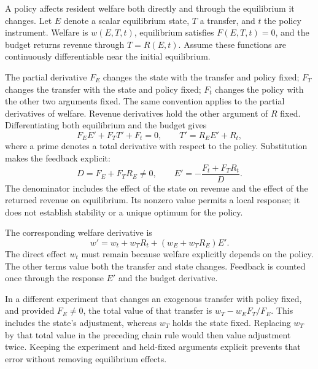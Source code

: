 A policy affects resident welfare both directly and through the equilibrium it
changes. Let $E$ denote a scalar equilibrium state, $T$ a transfer, and $t$ the
policy instrument. Welfare is $w(E,T,t)$, equilibrium satisfies $F(E,T,t)=0$,
and the budget returns revenue through $T=R(E,t)$. Assume these functions are
continuously differentiable near the initial equilibrium.

The partial derivative $F_E$ changes the state with the transfer and policy
fixed; $F_T$ changes the transfer with the state and policy fixed; $F_t$ changes
the policy with the other two arguments fixed. The same convention applies to
the partial derivatives of welfare. Revenue derivatives hold the other argument
of $R$ fixed. Differentiating both equilibrium and the budget gives
\[
 F_E E'+F_T T'+F_t=0,\qquad T'=R_E E'+R_t,
\]
where a prime denotes a total derivative with respect to the policy. Substitution
makes the feedback explicit:
\[
 D=F_E+F_T R_E\ne0,\qquad E'=-\frac{F_t+F_T R_t}{D}.
\]
The denominator includes the effect of the state on revenue and the effect of
the returned revenue on equilibrium. Its nonzero value permits a local response;
it does not establish stability or a unique optimum for the policy.

The corresponding welfare derivative is
\[
 w'=w_t+w_T R_t+(w_E+w_T R_E)E'.
\]
The direct effect $w_t$ must remain because welfare explicitly depends on the
policy. The other terms value both the transfer and state changes. Feedback is
counted once through the response $E'$ and the budget derivative.

In a different experiment that changes an exogenous transfer with policy fixed,
and provided $F_E\ne0$, the total value of that transfer is
$w_T-w_E F_T/F_E$. This includes the state's adjustment, whereas $w_T$ holds
the state fixed. Replacing $w_T$ by that total value in the preceding chain rule
would then value adjustment twice. Keeping the experiment and held-fixed
arguments explicit prevents that error without removing equilibrium effects.
